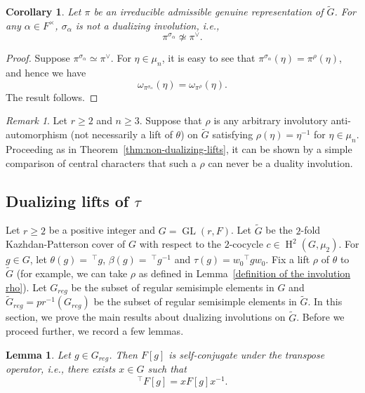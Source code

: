 \documentclass[11pt, a4paper, reqno]{amsart}
\newtheorem{lemma}[theorem]{Lemma}
\newtheorem{corollary}[theorem]{Corollary}
\theoremstyle{definition}
\theoremstyle{remark}
\newtheorem{remark}[theorem]{Remark}
\theoremstyle{example}
\theoremstyle{note}
\numberwithin{equation}{section}
\DeclareMathOperator{\GL}{GL}
\DeclareMathOperator{\coh}{H}
\begin{document}
\begin{corollary}\label{corollary:non-dualizing-lifts} Let $\pi$ be an irreducible admissible genuine representation of $\widetilde{G}$. For any $\alpha \in F^{\times}$, $\sigma_\alpha$ is not a dualizing involution, i.e., 
\[\pi^{\sigma_\alpha}\not\simeq \pi^{\vee}.
\]
\end{corollary}

\begin{proof} Suppose $\pi^{\sigma_\alpha}\simeq \pi^{\vee}$. For $\eta\in \mu_{n}$, it is easy to see that $\pi^{\sigma_{\alpha}}(\eta)=\pi^{\rho}(\eta)$, and hence we have 
$$\omega_{\pi^{\sigma_{\alpha}}}(\eta)=\omega_{\pi^{\rho}}(\eta).$$ The result follows. 
\end{proof}


\begin{remark} Let $r\geq 2$ and $n\geq 3$. Suppose that $\rho$ is any arbitrary involutory anti-automorphism (not necessarily a lift of $\theta$) on $\widetilde{G}$ satisfying $\rho(\eta)=\eta^{-1}$ for $\eta\in \mu_{n}$. Proceeding as in Theorem~\ref{thm:non-dualizing-lifts}, it can be shown by a simple comparison of central characters that such a $\rho$ can never be a duality involution. 
\end{remark}







\subsection{Dualizing lifts of $\tau$}


Let $r\geq 2$ be a positive integer and $G=\GL(r,F)$. Let $\widetilde{G}$ be the $2$-fold Kazhdan-Patterson cover of $G$ with respect to the $2$-cocycle $c\in \coh^{2}(G, \mu_{2})$. For $g\in G$, let $\theta(g)=~^{\top}g$, $\beta(g)=~^{\top}g^{-1}$ and $\tau(g)=w_{0} {}^{\top}g w_{0}$. Fix a lift $\rho$ of $\theta$ to $\widetilde{G}$ (for example, we can take $\rho$ as defined in Lemma~\ref{definition of the involution rho}). Let $G_{reg}$ be the subset of regular semisimple elements in $G$ and $\widetilde{G}_{reg}= pr^{-1}(G_{reg})$ be the subset of regular semisimple elements in $\widetilde{G}$. In this section, we prove the main results about dualizing involutions on $\widetilde{G}$. Before we proceed further, we record a few lemmas. 


\begin{lemma} Let $g\in G_{reg}$. Then $F[g]$ is self-conjugate under the transpose operator, i.e., there exists $x\in G$ such that 
\[^{\top}F[g]=xF[g]x^{-1}. \]
\end{lemma}
\end{document}
